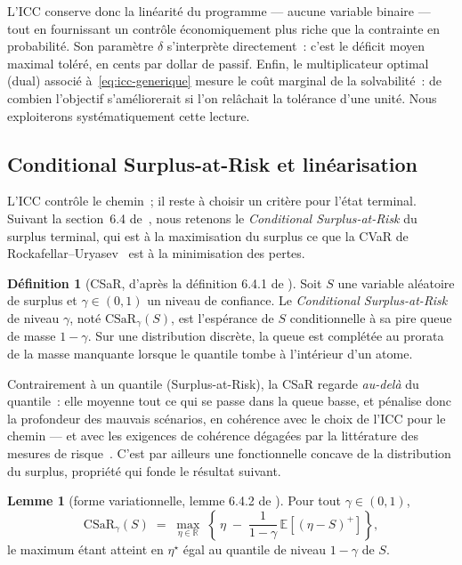 \documentclass[11pt,letterpaper]{article}
\newcommand{\E}{\mathbb{E}}
\newcommand{\R}{\mathbb{R}}
\newcommand{\CSaR}{\mathrm{CSaR}}
\newcommand{\pos}[1]{\left(#1\right)^{+}}
\theoremstyle{definition}
\newtheorem{definition}{Définition}
\newtheorem{lemme}{Lemme}
\begin{document}
L'ICC conserve donc la linéarité du programme --- aucune variable binaire --- tout
en fournissant un contrôle économiquement plus riche que la contrainte en
probabilité. Son paramètre $\delta$ s'interprète directement~: c'est le déficit
moyen maximal toléré, en cents par dollar de passif. Enfin, le multiplicateur
optimal (dual) associé à~\eqref{eq:icc-generique} mesure le coût marginal de la
solvabilité~: de combien l'objectif s'améliorerait si l'on relâchait la tolérance
d'une unité. Nous exploiterons systématiquement cette lecture.

\subsection{Conditional Surplus-at-Risk et linéarisation}\label{ssec:csar}

L'ICC contrôle le chemin~; il reste à choisir un critère pour l'état terminal.
Suivant la section~6.4 de~\cite{KHvdVR2020}, nous retenons le
\emph{Conditional Surplus-at-Risk} du surplus terminal, qui est à la maximisation
du surplus ce que la CVaR de Rockafellar--Uryasev~\cite{RU2000} est à la
minimisation des pertes.

\begin{definition}[CSaR, d'après la définition 6.4.1 de \cite{KHvdVR2020}]
Soit $S$ une variable aléatoire de surplus et $\gamma \in (0,1)$ un niveau de
confiance. Le \emph{Conditional Surplus-at-Risk} de niveau $\gamma$, noté
$\CSaR_\gamma(S)$, est l'espérance de $S$ conditionnelle à sa pire queue de masse
$1-\gamma$. Sur une distribution discrète, la queue est complétée au prorata de la
masse manquante lorsque le quantile tombe à l'intérieur d'un atome.
\end{definition}

Contrairement à un quantile (Surplus-at-Risk), la CSaR regarde \emph{au-delà} du
quantile~: elle moyenne tout ce qui se passe dans la queue basse, et pénalise donc
la profondeur des mauvais scénarios, en cohérence avec le choix de l'ICC pour le
chemin --- et avec les exigences de cohérence dégagées par la littérature des
mesures de risque~\cite{Artzner1999}. C'est par ailleurs une fonctionnelle concave de la distribution du surplus,
propriété qui fonde le résultat suivant.

\begin{lemme}[forme variationnelle, lemme 6.4.2 de \cite{KHvdVR2020}]
\label{lem:csar-var}
Pour tout $\gamma \in (0,1)$,
\begin{equation}\label{eq:csar-var}
\CSaR_\gamma(S) \;=\; \max_{\eta \in \R}\;
\left\{\, \eta \;-\; \frac{1}{1-\gamma}\, \E\!\left[\pos{\eta - S}\right] \right\},
\end{equation}
le maximum étant atteint en $\eta^\star$ égal au quantile de niveau $1-\gamma$ de
$S$.
\end{lemme}
\end{document}
